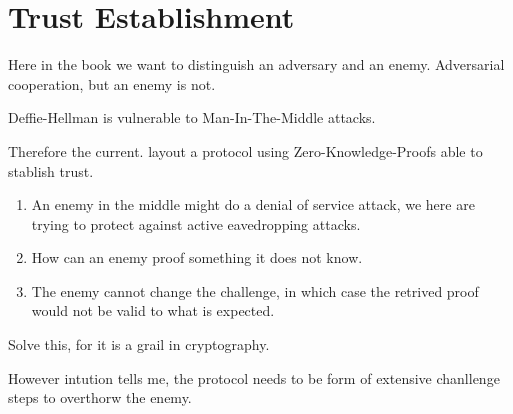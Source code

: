 \chapter{Trust Establishment}

Here in the book we want to distinguish an adversary and an enemy. Adversarial cooperation, but an enemy is not. 

Deffie-Hellman is vulnerable to Man-In-The-Middle attacks. 

Therefore the current. layout a protocol using Zero-Knowledge-Proofs able to stablish trust. 

\begin{enumerate}
    \item An enemy in the middle might do a denial of service attack, we here are trying to protect against active eavedropping attacks. 
    \item How can an enemy proof something it does not know. 
    \item The enemy cannot change the challenge, in which case the retrived proof would not be valid to what is expected. 
\end{enumerate}

Solve this, for it is a grail in cryptography. 

However intution tells me, the protocol needs to be form of extensive chanllenge steps to overthorw the enemy. 
